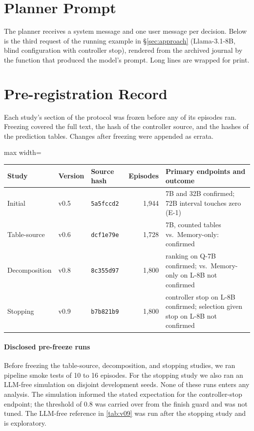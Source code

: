 \section{Planner Prompt}
\label{app:prompt}

The planner receives a system message and one user message per decision. Below is the third request of the running example in \S\ref{sec:approach} (Llama-3.1-8B, blind configuration with controller stop), rendered from the archived journal by the function that produced the model's prompt. Long lines are wrapped for print.



\section{Pre-registration Record}
\label{app:prereg}

Each study's section of the protocol was frozen before any of its episodes ran. Freezing covered the full text, the hash of the controller source, and the hashes of the prediction tables. Changes after freezing were appended as errata.

\begin{table}[t]
  \centering\small
  \begin{adjustbox}{max width=\textwidth}
  \begin{tabular}{lllrl}
    \toprule
    Study & Version & Source hash & Episodes & Primary endpoints and outcome \\
    \midrule
    Initial & v0.5 & \texttt{5a5fccd2} & 1{,}944 & 7B and 32B confirmed; 72B interval touches zero (E-1) \\
    Table-source & v0.6 & \texttt{dcf1e79e} & 1{,}728 & 7B, counted tables vs.\ Memory-only: confirmed \\
    Decomposition & v0.8 & \texttt{8c355d97} & 1{,}800 & ranking on Q-7B confirmed; \hesp{} vs.\ Memory-only on L-8B not confirmed \\
    Stopping & v0.9 & \texttt{b7b821b9} & 1{,}800 & controller stop on L-8B confirmed; selection given stop on L-8B not confirmed \\
    \bottomrule
  \end{tabular}
  \end{adjustbox}
\end{table}

\paragraph{Disclosed pre-freeze runs} Before freezing the table-source, decomposition, and stopping studies, we ran pipeline smoke tests of 10 to 16 episodes. For the stopping study we also ran an LLM-free simulation on disjoint development seeds. None of these runs enters any analysis. The simulation informed the stated expectation for the controller-stop endpoint; the threshold of 0.8 was carried over from the finish guard and was not tuned. The LLM-free reference in \cref{tab:v09} was run after the stopping study and is exploratory.

